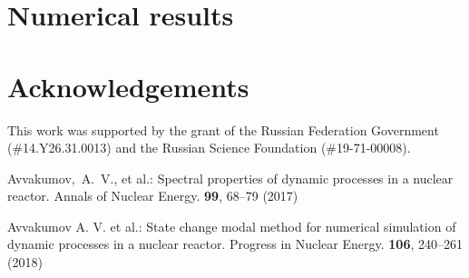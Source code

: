 \documentclass[runningheads]{llncs}
\begin{document}
\section{Numerical results}


\section*{Acknowledgements}
This work was supported by the grant of the Russian Federation Government
(\#14.Y26.31.0013) and the Russian Science Foundation (\#19-71-00008).

\begin{thebibliography}{8}
Avvakumov,~A.~V., et al.: Spectral properties of dynamic processes in a nuclear reactor. Annals of Nuclear Energy. \textbf{99}, 68--79 (2017) 

Avvakumov A. V. et al.: State change modal method for numerical simulation of dynamic processes in a nuclear reactor. Progress in Nuclear Energy. \textbf{106}, 240--261 (2018)

\end{thebibliography}
\end{document}
